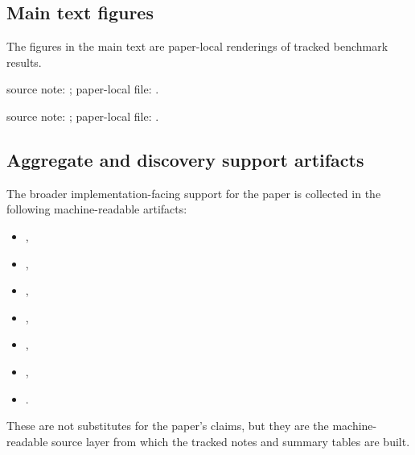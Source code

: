 \documentclass[11pt]{article}
\theoremstyle{definition}
\begin{document}
\subsection{Main text figures}\label{appsubsec:artifact-figures}
The figures in the main text are paper-local renderings of tracked benchmark results.
\begin{description}[leftmargin=!,labelwidth=2.8cm]
\item[Figure~\ref{fig:dissipative-collapse}] source note:
; paper-local file:
.

\item[Figure~\ref{fig:memory-wheel-asymmetry}] source note:
; paper-local file:
.
\end{description}

\subsection{Aggregate and discovery support artifacts}\label{appsubsec:artifact-support}
The broader implementation-facing support for the paper is collected in the following machine-readable artifacts:
\begin{itemize}[leftmargin=*]
\item {},
\item {},
\item {},
\item {},
\item {},
\item {},
\item {}.
\end{itemize}
These are not substitutes for the paper's claims, but they are the machine-readable source layer from which the tracked notes and summary tables are built.
\end{document}
